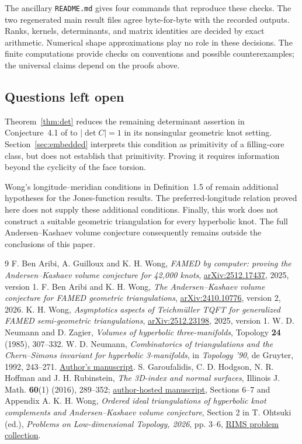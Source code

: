 \documentclass[11pt]{article}
\theoremstyle{definition}\newtheorem{definition}[theorem]{Definition}
\theoremstyle{remark}\newtheorem{remark}[theorem]{Remark}
\begin{document}
The ancillary \texttt{README.md} gives four commands that reproduce these checks. The two regenerated main result files agree byte-for-byte with the recorded outputs. Ranks, kernels, determinants, and matrix identities are decided by exact arithmetic. Numerical shape approximations play no role in these decisions. The finite computations provide checks on conventions and possible counterexamples; the universal claims depend on the proofs above.

\subsection{Questions left open}
Theorem~\ref{thm:det} reduces the remaining determinant assertion in Conjecture~4.1 of \cite{BGW} to $|\det C|=1$ in its nonsingular geometric knot setting. Section~\ref{sec:embedded} interprets this condition as primitivity of a filling-core class, but does not establish that primitivity. Proving it requires information beyond the cyclicity of the face torsion.

Wong's longitude--meridian conditions in Definition~1.5 of \cite{Wong} remain additional hypotheses for the Jones-function results. The preferred-longitude relation proved here does not supply these additional conditions. Finally, this work does not construct a suitable geometric triangulation for every hyperbolic knot. The full Andersen--Kashaev volume conjecture consequently remains outside the conclusions of this paper.

\clearpage
\begin{thebibliography}{9}
F. Ben Aribi, A. Guilloux and K. H. Wong, \emph{FAMED by computer: proving the Andersen--Kashaev volume conjecture for 42,000 knots}, \href{https://arxiv.org/abs/2512.17437v1}{arXiv:2512.17437}, 2025, version 1.
F. Ben Aribi and K. H. Wong, \emph{The Andersen--Kashaev volume conjecture for FAMED geometric triangulations}, \href{https://arxiv.org/abs/2410.10776v2}{arXiv:2410.10776}, version 2, 2026.
K. H. Wong, \emph{Asymptotics aspects of Teichm\"uller TQFT for generalized FAMED semi-geometric triangulations}, \href{https://arxiv.org/abs/2512.23198v1}{arXiv:2512.23198}, 2025, version 1.
W. D. Neumann and D. Zagier, \emph{Volumes of hyperbolic three-manifolds}, Topology \textbf{24} (1985), 307--332.
W. D. Neumann, \emph{Combinatorics of triangulations and the Chern--Simons invariant for hyperbolic 3-manifolds}, in \emph{Topology '90}, de Gruyter, 1992, 243--271. \href{https://www.math.columbia.edu/department/neumann/preprints/cspaper.pdf}{Author's manuscript}.
S. Garoufalidis, C. D. Hodgson, N. R. Hoffman and J. H. Rubinstein, \emph{The 3D-index and normal surfaces}, Illinois J. Math. \textbf{60}(1) (2016), 289--352; \href{https://people.mpim-bonn.mpg.de/stavros/publications/normal.surfaces.3Dindex.pdf}{author-hosted manuscript}, Sections 6--7 and Appendix A.
K. H. Wong, \emph{Ordered ideal triangulations of hyperbolic knot complements and Andersen--Kashaev volume conjecture}, Section 2 in T. Ohtsuki (ed.), \emph{Problems on Low-dimensional Topology, 2026}, pp. 3--6, \href{https://www.kurims.kyoto-u.ac.jp/~ildt/prob26.pdf}{RIMS problem collection}.
\end{thebibliography}
\appendix
\end{document}
